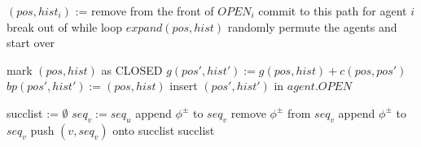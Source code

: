 \documentclass[letterpaper]{article}
\begin{document}
\begin{algorithm}
\caption{$Greedy VOCA*$}
\label{alg:update}
\begin{algorithmic}
\STATE $(pos, hist_i)$ := remove from the front of $OPEN_{i}$
\STATE commit to this path for agent $i$
\STATE break out of while loop
\ENDIF
\STATE $expand(pos, hist)$
\ENDWHILE
{}
\STATE randomly permute the agents and start over
\ENDIF
\ENDFOR
\end{algorithmic}
\end{algorithm}

\begin{algorithm}
\caption{$expand(pos, hist)$}
\label{alg:update}
\begin{algorithmic}
\STATE mark $(pos, hist)$ as CLOSED
\STATE $g(pos', hist') := g(pos, hist) + c(pos, pos')$
\STATE $bp(pos', hist') := (pos, hist)$
\STATE insert $(pos', hist')$ in $agent.OPEN$
\ENDIF
\ENDIF
\ENDFOR
\end{algorithmic}
\end{algorithm}

\begin{comment}

\begin{algorithm}
\caption{$MultiAgent A^*HighLevel()$}
\label{alg:update}
\begin{algorithmic}
\STATE $\forall i:\; s_i := start_i$
\WHILE {$g(goal_1, \ldots, goal_N) > f(s_1,\ldots,s_N)$}
\STATE $\forall i:\; expand(s_i)$
\STATE $(s_1,\ldots,s_N) = \arg\min_{s_1,\ldots,s_N} f(s_1,\ldots,s_N)$
\ENDWHILE
\end{algorithmic}
\end{algorithm}

\begin{algorithm}
\caption{$f(s)$}
\label{alg:update}
\begin{algorithmic}
\STATE $f := \infty$
\FORALL {tuples $s_{1\ldots N}\in OPEN$ that include $s$}
\STATE $f := \min(f, jointPriority(s_{1\ldots N}))$
\ENDFOR
\RETURN $f$
\end{algorithmic}
\end{algorithm}

\end{comment}

\begin{algorithm}
\caption{$successors(u, seq_u)$}
\label{alg:update}
\begin{algorithmic}
\STATE succlist := $\emptyset$
\STATE $seq_v := seq_u$
\STATE append $\phi^\pm$ to $seq_v$
\ENDFOR
{}
\STATE remove $\phi^\pm$ from $seq_v$
\STATE append $\phi^\pm$ to $seq_v$
\ENDFOR
\STATE push $(v,seq_v)$ onto succlist
\ENDFOR
\RETURN succlist
\end{algorithmic}
\end{algorithm}
\end{document}

